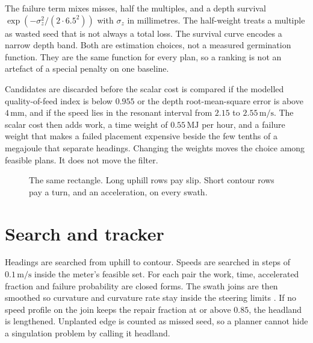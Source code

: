 \documentclass[11pt,a4paper]{article}
\begin{document}
The failure term mixes misses, half the multiples, and a depth survival \(\exp(-\sigma_z^2/(2\cdot 6.5^2))\) with \(\sigma_z\) in millimetres. The half-weight treats a multiple as wasted seed that is not always a total loss. The survival curve encodes a narrow depth band. Both are estimation choices, not a measured germination function. They are the same function for every plan, so a ranking is not an artefact of a special penalty on one baseline.

Candidates are discarded before the scalar cost is compared if the modelled quality-of-feed index is below \(0.955\) or the depth root-mean-square error is above \(4\,\mathrm{mm}\), and if the speed lies in the resonant interval from \(2.15\) to \(2.55\,\mathrm{m/s}\). The scalar cost then adds work, a time weight of \(0.55\,\mathrm{MJ}\) per hour, and a failure weight that makes a failed placement expensive beside the few tenths of a megajoule that separate headings. Changing the weights moves the choice among feasible plans. It does not move the filter.

\begin{figure}[t]
\centering
{}
\caption{The same rectangle. Long uphill rows pay slip. Short contour rows pay a turn, and an acceleration, on every swath.}
\label{fig:field}
\end{figure}

\section{Search and tracker}
Headings are searched from uphill to contour. Speeds are searched in steps of \(0.1\,\mathrm{m/s}\) inside the meter's feasible set. For each pair the work, time, accelerated fraction and failure probability are closed forms. The swath joins are then smoothed so curvature and curvature rate stay inside the steering limits \cite{plessen2017}. If no speed profile on the join keeps the repair fraction at or above \(0.85\), the headland is lengthened. Unplanted edge is counted as missed seed, so a planner cannot hide a singulation problem by calling it headland.
\end{document}
